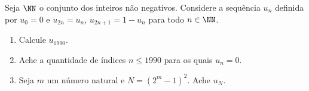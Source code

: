 Seja $\NN$ o conjunto dos inteiros não negativos. Considere a sequência $u_n$ definida por $u_0 = 0$ e $u_{2n} = u_n$, $u_{2n+1} = 1 - u_n$ para todo $n \in \NN$.

\begin{enumerate}[label = (\alph*)]
	\item Calcule $u_{1990}$.
	\item Ache a quantidade de índices $n \le 1990$ para os quais $u_n = 0$.
	\item Seja $m$ um número natural e $N = (2^m - 1)^2$. Ache $u_N$.
\end{enumerate}
